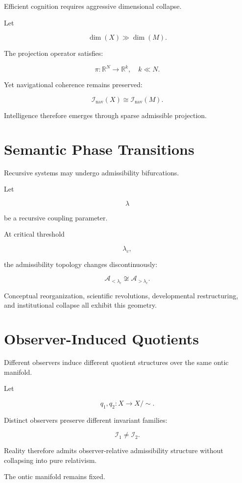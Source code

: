 \documentclass[12pt,openany]{book}
\theoremstyle{plain}
\theoremstyle{definition}
\theoremstyle{remark}
\begin{document}
Efficient cognition requires aggressive dimensional collapse.

Let

\[
\dim(X)
\gg
\dim(M).
\]

The projection operator satisfies:

\[
\pi :
\mathbb{R}^N
\to
\mathbb{R}^k,
\quad
k \ll N.
\]

Yet navigational coherence remains preserved:

\[
\mathcal{I}_{\mathrm{nav}}(X)
\cong
\mathcal{I}_{\mathrm{nav}}(M).
\]

Intelligence therefore emerges through sparse admissible
projection.

\section{Semantic Phase Transitions}

Recursive systems may undergo admissibility bifurcations.

Let

\[
\lambda
\]

be a recursive coupling parameter.

At critical threshold

\[
\lambda_c,
\]

the admissibility topology changes discontinuously:

\[
\mathcal{A}_{<\lambda_c}
\not\cong
\mathcal{A}_{>\lambda_c}.
\]

Conceptual reorganization, scientific revolutions, developmental
restructuring, and institutional collapse all exhibit this
geometry.

\section{Observer-Induced Quotients}

Different observers induce different quotient structures over the
same ontic manifold.

Let

\[
q_1,q_2 :
X \to X/{\sim}.
\]

Distinct observers preserve different invariant families:

\[
\mathcal{I}_1
\neq
\mathcal{I}_2.
\]

Reality therefore admits observer-relative admissibility
structure without collapsing into pure relativism.

The ontic manifold remains fixed.
\end{document}
